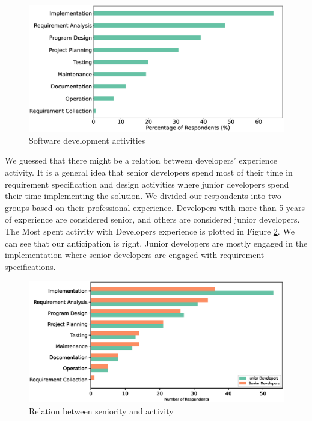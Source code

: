 \begin{figure}[h]
\centering
  \includegraphics[scale=0.2]{Figures/Respondents_Activities}
  \caption{Software development activities}
  \label{fig:activities}
\end{figure}

We guessed that there might be a relation between developers' experience activity. It is a general idea that senior developers spend most of their time in requirement specification and design activities where junior developers spend their time implementing the solution. We divided our respondents into two groups based on their professional experience. Developers with more than 5 years of experience are considered senior, and others are considered junior developers. The Most spent activity with Developers experience is plotted in Figure \ref{fig:activity and seniority}. We can see that our anticipation is right. Junior developers are mostly engaged in the implementation where senior developers are engaged with requirement specifications.

\begin{figure}[h]
\centering
  \includegraphics[scale=0.4]{Figures/Activity_and_Seniority.eps}
  \caption{Relation between seniority and activity}
  \label{fig:activity and seniority}
\end{figure}

